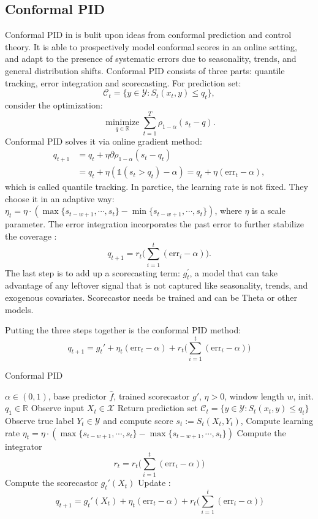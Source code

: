 \subsection{Conformal PID}
Conformal PID in  is bulit upon ideas from conformal prediction and control theory.
It is able to prospectively model conformal scores in an online setting, and adapt to the presence of systematic errors due to seasonality, trends, and general distribution shifts. Conformal PID consists of three parts: quantile tracking, error integration and scorecasting.
For prediction set: $$\mathcal{C}_t=\{y\in\mathcal{Y}:S_t(x_t,y)\leq q_t\},$$ consider the optimization:
$$
    \underset{q\in\mathbb{R}}{\operatorname*{minimize}}\sum_{t=1}^T\rho_{1-\alpha}(s_t-q).
$$
Conformal PID solves it via online gradient method:
$$
\begin{aligned}
q_{t+1} &=q_t+\eta\partial\rho_{1-\alpha}(s_t-q_t) \\&
=q_t+\eta(\mathds{1}(s_t>q_t)-\alpha)=q_t+\eta(\mathrm{err}_t-\alpha), 
\end{aligned}
$$
which is called quantile tracking. In parctice,  the learning rate  is not fixed. They choose it in an adaptive way: $\eta_t=\eta \cdot (\max\{s_{t-w+1},\cdots,s_t\}-\min\{s_{t-w+1},\cdots,s_t\})$, where $\eta$ is a scale parameter. 
The error integration incorporates the past error to  further stabilize the coverage   :$$q_{t+1}=r_t\bigg(\sum_{i=1}^t(\text{err}_i-\alpha)\bigg).$$
The last step is to add up a scorecasting term: $g^{'}_t$, a model that can take
advantage of any leftover signal that is not captured like seasonality, trends, and exogenous covariates. Scorecastor needs be trained and can be Theta or other models.

Putting the three steps together is the conformal PID method:
$$q_{t+1}=g_t'+\eta_t(\text{err}_t-\alpha)+r_t\bigg(\sum_{i=1}^t(\text{err}_i-\alpha)\bigg)$$
\begin{algorithm}
\caption{Conformal PID}\label{algorithm4}
\begin{algorithmic}[1]
\Require $\alpha \in (0, 1)$,  base predictor $\hat{f}$, trained scorecastor $g'$, $\eta > 0$, window length $w$, init. $q_1 \in \mathbb{R}$
    \State Observe input $X_t \in \mathcal{X}$
    \State Return prediction set $\mathcal{C}_t=\{y\in\mathcal{Y}:S_t(x_t,y)\leq q_t\}$
    \State Observe true label $Y_t \in \mathcal{Y}$ and compute score $s_t:=S_t(X_t,Y_t)$,
    \State Compute learning rate $\eta_t=\eta \cdot (\max\{s_{t-w+1},\cdots,s_t\}-\max\{s_{t-w+1},\cdots,s_t\})$
    \State Compute the integrator  
    \[
    r_t= r_t\bigg(\sum_{i=1}^t(\text{err}_i-\alpha)\bigg)
    \]
    \State Compute the scorecastor $g_t'(X_t)$
    \State Update :
    $$q_{t+1}=g_t'(X_t)+\eta_t(\text{err}_t-\alpha)+r_t\bigg(\sum_{i=1}^t(\text{err}_i-\alpha)\bigg)$$
\EndFor
\end{algorithmic}
\end{algorithm}

